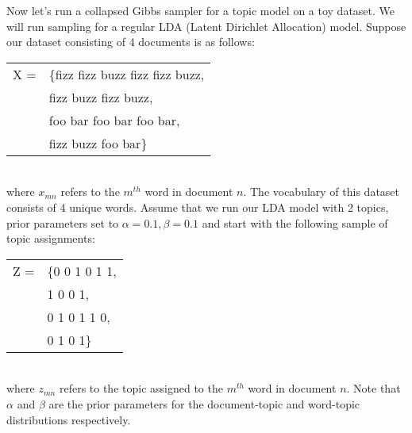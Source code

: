 \documentclass[11pt,addpoints,answers]{exam}
\numberwithin{equation}{section} %
\numberwithin{figure}{section} %
\numberwithin{table}{section} %
\begin{document}
\begin{questions}
\question Now let's run a collapsed Gibbs sampler for a topic model on a toy dataset. We will run sampling for a regular LDA (Latent Dirichlet Allocation) model. Suppose our dataset consisting of 4 documents is as follows:\\
\begin{table}[h]
    \centering
    \begin{tabular}{cl}
        X = &\{fizz fizz buzz fizz fizz buzz,\\
         &  fizz buzz fizz buzz,\\
         & foo bar foo bar foo bar,\\
            & fizz buzz foo bar\} \\
    \end{tabular}
\end{table}\\
where $x_{mn}$ refers to the $m^{th}$ word in document $n$. The vocabulary of this dataset consists of 4 unique words. Assume that we run our LDA model with 2 topics, prior parameters set to $\alpha = 0.1, \beta = 0.1$ and start with the following sample of topic assignments:\\
\begin{table}[h]
    \centering
    \begin{tabular}{cl}
        Z = &\{0 0 1 0 1 1,\\
         &  1 0 0 1,\\
         & 0 1 0 1 1 0,\\
            & 0 1 0 1\} \\
    \end{tabular}
\end{table}\\
where $z_{mn}$ refers to the topic assigned to the $m^{th}$ word in document $n$. Note that $\alpha$ and $\beta$ are the prior parameters for the document-topic and word-topic distributions respectively.
\end{questions}
\end{document}

